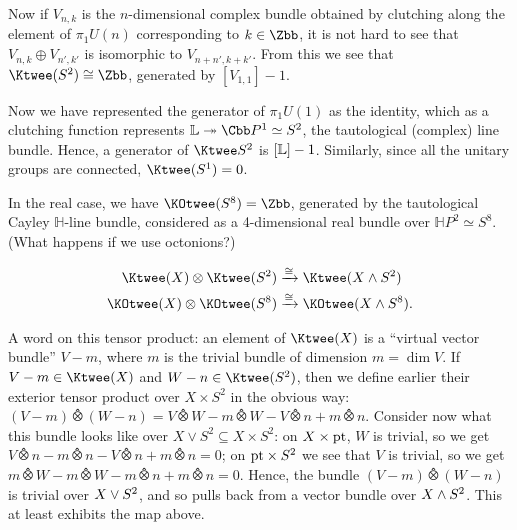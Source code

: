 Now if $V_{n,k}$ is the $n$-dimensional complex bundle obtained by clutching along the element of $\pi_1 U(n)$ corresponding to $k\in\Zbb$, it is not hard to see that $V_{n,k}\oplus V_{n',k'}$ is isomorphic to $V_{n+n',k+k'}$. From this we see that $\Ktwee(S^2) \cong \Zbb$, generated by $[V_{1,1}]-1$.

Now we have represented the generator of $\pi_1 U(1)$ as the identity, which as a clutching function represents $\bundle{L} \onto \CP^1 \simeq S^2$, the tautological (complex) line bundle.  Hence, a generator of $\Ktwee S^2$ is $[\mathbb{L}] - 1$.  Similarly, since all the unitary groups are connected, $\Ktwee(S^1) = 0$.

\begin{fact}
In the real case, we have $\KOtwee(S^8) = \Zbb$, generated by the tautological Cayley $\mathbb{H}$-line bundle, considered as a 4-dimensional real bundle over $\mathbb{H}P^2 \simeq S^8$. (What happens if we use octonions?) %
\end{fact}

\begin{thm}
\begin{align*}
\Ktwee (X) \otimes \Ktwee (S^2) & \xrightarrow{\cong} \Ktwee(X \sprod S^2) \\
\KOtwee (X) \otimes \KOtwee (S^8) & \xrightarrow{\cong} \KOtwee(X \sprod S^8).
\end{align*}
\end{thm}

A word on this tensor product: an element of $\Ktwee (X)$ is a ``virtual vector bundle'' $V - m$, where $m$ is the trivial bundle of dimension $m = \dim V$.  If $V - m \in \Ktwee(X)$ and $W - n \in \Ktwee(S^2)$, then we define earlier their exterior tensor product over $X \times S^2$ in the obvious way: $(V - m)\otimeshat(W - n) = V \otimeshat W - m \otimeshat W - V \otimeshat n + m \otimeshat n$.  Consider now what this bundle looks like over $X \vee S^2 \subseteq X \times S^2$: on $X \times \mathrm{pt}$, $W$ is trivial, so we get $V \otimeshat n - m \otimeshat n - V \otimeshat n + m \otimeshat n = 0$; on $\mathrm{pt} \times S^2$ we see that $V$ is trivial, so we get $m \otimeshat W - m \otimeshat W - m \otimeshat n + m \otimeshat n = 0$.  Hence, the bundle $(V - m) \otimeshat (W - n)$ is trivial over $X \vee S^2$, and so pulls back from a vector bundle over $X \wedge S^2$.  This at least exhibits the map above.

